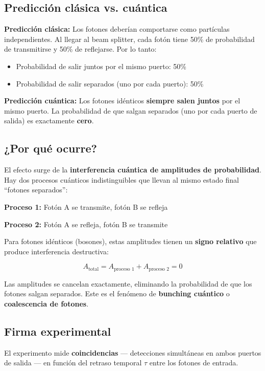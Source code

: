 \documentclass[11pt,a4paper,spanish]{book}
\begin{document}
\subsection*{Predicción clásica vs. cuántica}

\textbf{Predicción clásica:} Los fotones deberían comportarse como partículas independientes. Al llegar al beam splitter, cada fotón tiene 50\% de probabilidad de transmitirse y 50\% de reflejarse. Por lo tanto:
\begin{itemize}
	\item Probabilidad de salir juntos por el mismo puerto: 50\%
	\item Probabilidad de salir separados (uno por cada puerto): 50\%
\end{itemize}

\textbf{Predicción cuántica:} Los fotones idénticos \textbf{siempre salen juntos} por el mismo puerto. La probabilidad de que salgan separados (uno por cada puerto de salida) es exactamente \textbf{cero}.

\subsection*{¿Por qué ocurre?}

El efecto surge de la \textbf{interferencia cuántica de amplitudes de probabilidad}. Hay dos procesos cuánticos indistinguibles que llevan al mismo estado final ``fotones separados'':

\textbf{Proceso 1:} Fotón A se transmite, fotón B se refleja

\textbf{Proceso 2:} Fotón A se refleja, fotón B se transmite

Para fotones idénticos (bosones), estas amplitudes tienen un \textbf{signo relativo} que produce interferencia destructiva:

\[
A_{\text{total}} = A_{\text{proceso 1}} + A_{\text{proceso 2}} = 0
\]

Las amplitudes se cancelan exactamente, eliminando la probabilidad de que los fotones salgan separados. Este es el fenómeno de \textbf{bunching cuántico} o \textbf{coalescencia de fotones}.

\subsection*{Firma experimental}

El experimento mide \textbf{coincidencias} — detecciones simultáneas en ambos puertos de salida — en función del retraso temporal $\tau$ entre los fotones de entrada.
\end{document}
